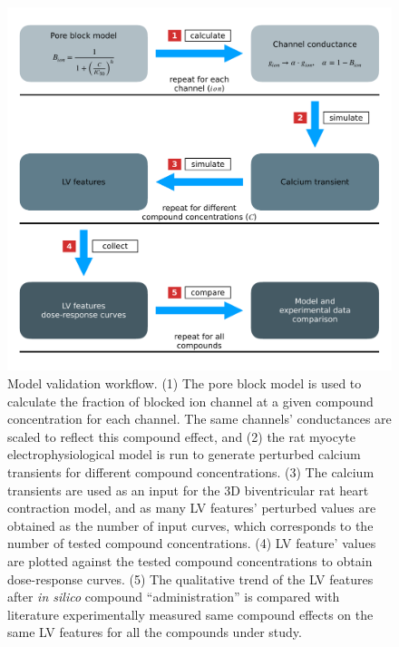 \begin{figure}[ht!]
    \myfloatalign
    \includegraphics[width=\textwidth]{figures/chapter06/model_validation_schematic.pdf}
    \caption{Model validation workflow. (1) The pore block model is used to calculate the fraction of blocked ion channel at a given compound concentration for each channel. The same channels' conductances are scaled to reflect this compound effect, and (2) the rat myocyte electrophysiological model is run to generate perturbed calcium transients for different compound concentrations. (3) The calcium transients are used as an input for the $3$D biventricular rat heart contraction model, and as many LV features' perturbed values are obtained as the number of input curves, which corresponds to the number of tested compound concentrations. (4) LV feature' values are plotted against the tested compound concentrations to obtain dose-response curves. (5) The qualitative trend of the LV features after \textit{in silico} compound ``administration'' is compared with literature experimentally measured same compound effects on the same LV features for all the compounds under study.}
    \label{fig:validationschematic}
\end{figure}


%
%
%
